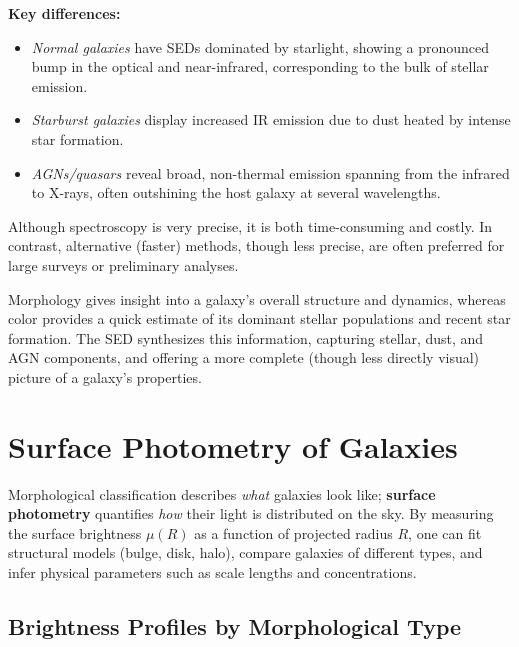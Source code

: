 \hfill
\begin{minipage}{0.53\textwidth}
    \vspace{0.5em}
    \textbf{Key differences:}
    \begin{itemize}
        \item \emph{Normal galaxies} have SEDs dominated by starlight, showing a pronounced bump in the optical and near-infrared, corresponding to the bulk of stellar emission.
        \item \emph{Starburst galaxies} display increased IR emission due to dust heated by intense star formation.
        \item \emph{AGNs/quasars} reveal broad, non-thermal emission spanning from the infrared to X-rays, often outshining the host galaxy at several wavelengths.
    \end{itemize}
\end{minipage}

Although spectroscopy is very precise, it is both time-consuming and costly. In contrast, alternative (faster) methods, though less precise, are often preferred for large surveys or preliminary analyses.

\begin{tipsblock}
    Morphology gives insight into a galaxy's overall structure and dynamics, whereas color provides a quick estimate of its dominant stellar populations and recent star formation. The SED synthesizes this information, capturing stellar, dust, and AGN components, and offering a more complete (though less directly visual) picture of a galaxy's properties.
\end{tipsblock}


\section{Surface Photometry of Galaxies}

Morphological classification describes \textit{what} galaxies look like; \textbf{surface photometry} quantifies \textit{how} their light is distributed on the sky. By measuring the surface brightness $\mu(R)$ as a function of projected radius $R$, one can fit structural models (bulge, disk, halo), compare galaxies of different types, and infer physical parameters such as scale lengths and concentrations.

\subsection{Brightness Profiles by Morphological Type}

